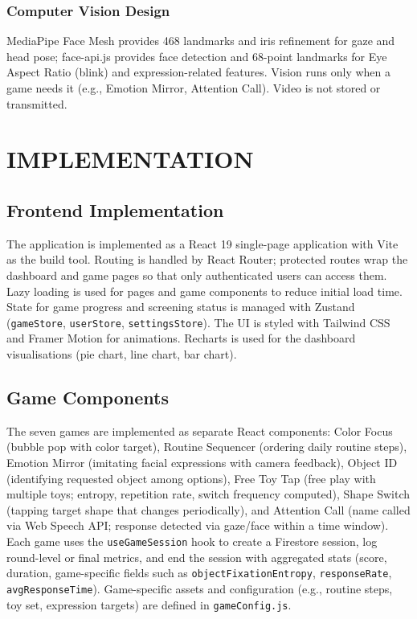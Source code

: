 \documentclass[12pt,a4paper]{report}
\begin{document}
\subsection{Computer Vision Design}
MediaPipe Face Mesh provides 468 landmarks and iris refinement for gaze and head pose; face-api.js provides face detection and 68-point landmarks for Eye Aspect Ratio (blink) and expression-related features. Vision runs only when a game needs it (e.g., Emotion Mirror, Attention Call). Video is not stored or transmitted.
\chapter{IMPLEMENTATION}
\section{Frontend Implementation}
The application is implemented as a React 19 single-page application with Vite as the build tool. Routing is handled by React Router; protected routes wrap the dashboard and game pages so that only authenticated users can access them. Lazy loading is used for pages and game components to reduce initial load time. State for game progress and screening status is managed with Zustand (\texttt{gameStore}, \texttt{userStore}, \texttt{settingsStore}). The UI is styled with Tailwind CSS and Framer Motion for animations. Recharts is used for the dashboard visualisations (pie chart, line chart, bar chart).
\section{Game Components}
The seven games are implemented as separate React components: Color Focus (bubble pop with color target), Routine Sequencer (ordering daily routine steps), Emotion Mirror (imitating facial expressions with camera feedback), Object ID (identifying requested object among options), Free Toy Tap (free play with multiple toys; entropy, repetition rate, switch frequency computed), Shape Switch (tapping target shape that changes periodically), and Attention Call (name called via Web Speech API; response detected via gaze/face within a time window). Each game uses the \texttt{useGameSession} hook to create a Firestore session, log round-level or final metrics, and end the session with aggregated stats (score, duration, game-specific fields such as \texttt{objectFixationEntropy}, \texttt{responseRate}, \texttt{avgResponseTime}). Game-specific assets and configuration (e.g., routine steps, toy set, expression targets) are defined in \texttt{gameConfig.js}.
\end{document}
